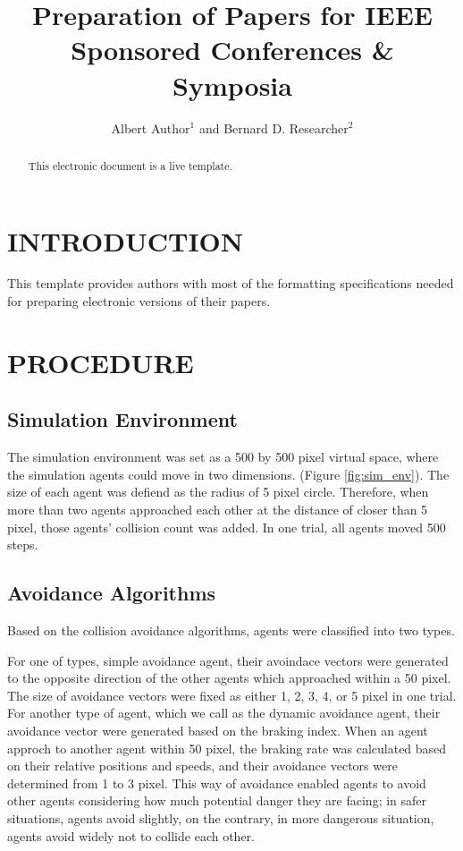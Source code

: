 \documentclass[letterpaper, 10 pt, conference]{ieeeconf}  %
\title{\LARGE \bf
Preparation of Papers for IEEE Sponsored Conferences \& Symposia
}
\author{Albert Author$^{1}$ and Bernard D. Researcher$^{2}$}
\begin{document}
\maketitle
\thispagestyle{empty}
\pagestyle{empty}


\begin{abstract}

This electronic document is a live template. 

\end{abstract}

\section{INTRODUCTION}

This template provides authors with most of the formatting specifications needed for preparing electronic versions of their papers. 

\section{PROCEDURE}

\subsection{Simulation Environment}
The simulation environment was set as a 500 by 500 pixel virtual space, where the simulation agents could move in two dimensions. (Figure \ref{fig:sim_env}). The size of each agent was defiend as the radius of 5 pixel circle. Therefore, when more than two agents approached each other at the distance of closer than 5 pixel, those agents' collision count was added. In one trial, all agents moved 500 steps.

\subsection{Avoidance Algorithms}
Based on the collision avoidance algorithms, agents were classified into two types.

For one of types, simple avoidance agent, their avoindace vectors were generated to the opposite direction of the other agents which approached within a 50 pixel. The size of avoidance vectors were fixed as either 1, 2, 3, 4, or 5 pixel in one trial. 
For another type of agent, which we call as the dynamic avoidance agent, their avoidance vector were generated based on the braking index. When an agent approch to another agent within 50 pixel, the braking rate was calculated based on their relative positions and speeds, and their avoidance vectors were determined from 1 to 3 pixel. This way of avoidance enabled agents to avoid other agents considering how much potential danger they are facing; in safer situations, agents avoid slightly, on the contrary, in more dangerous situation, agents avoid widely not to collide each other. 
\end{document}
